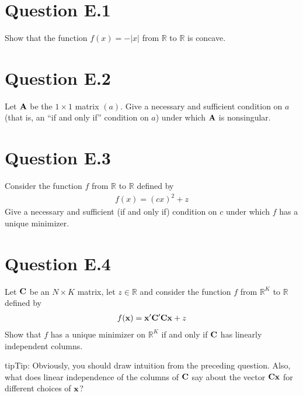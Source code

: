 \documentclass[letterpaper,10pt,english]{jupyterBook}
\begin{document}
\section{Question E.1}
\label{\detokenize{06.exercises.E:question-e-1}}
\sphinxAtStartPar
Show that the function \(f(x) = - |x|\) from \(\mathbb{R}\) to \(\mathbb{R}\) is concave.


\section{Question E.2}
\label{\detokenize{06.exercises.E:question-e-2}}
\sphinxAtStartPar
Let \({\bf A}\) be the \(1 \times 1\) matrix \((a)\). Give a necessary and
sufficient condition on \(a\) (that is, an “if and only if” condition on
\(a\)) under which \({\bf A}\) is nonsingular.


\section{Question E.3}
\label{\detokenize{06.exercises.E:question-e-3}}
\sphinxAtStartPar
Consider the function \(f\) from \(\mathbb{R}\) to \(\mathbb{R}\) defined by
\begin{equation*}
\begin{split}
%
f(x) = (c x)^2 + z
%
\end{split}
\end{equation*}
\sphinxAtStartPar
Give a necessary and sufficient (if and only if) condition on \(c\) under
which \(f\) has a unique minimizer.


\section{Question E.4}
\label{\detokenize{06.exercises.E:question-e-4}}
\sphinxAtStartPar
Let \({\bf C}\) be an \(N \times K\) matrix, let \(z \in \mathbb{R}\) and consider the function
\(f\) from \(\mathbb{R}^K\) to \(\mathbb{R}\) defined by
\begin{equation*}
\begin{split}
%
f({\bf x}) = {\bf x}' {\bf C}' {\bf C} {\bf x} + z
%
\end{split}
\end{equation*}
\sphinxAtStartPar
Show that \(f\) has a unique minimizer on \(\mathbb{R}^K\) if and only if \({\bf C}\)
has linearly independent columns.

\begin{sphinxadmonition}{tip}{Tip:}
\sphinxAtStartPar
Obviously, you should
draw intuition from the preceding question. Also, what does linear
independence of the columns of \({\bf C}\) say about the vector \({\bf C}
{\bf x}\) for different choices of \({\bf x}\)?
\end{sphinxadmonition}
\end{document}
